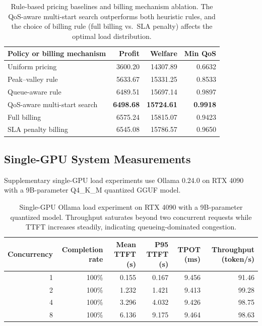 \documentclass[11pt]{article}
\begin{document}
\begin{table}[htbp]
\centering
\caption{Rule-based pricing baselines and billing mechanism ablation. The
QoS-aware multi-start search outperforms both heuristic rules, and the
choice of billing rule (full billing vs.\ SLA penalty) affects the optimal
load distribution.}
\label{tab:supplemental_policy}
\small
\begin{tabular}{lrrr}
\toprule
Policy or billing mechanism & Profit & Welfare & Min QoS \\
\midrule
Uniform pricing & 3600.20 & 14307.89 & 0.6632 \\
Peak--valley rule & 5633.67 & 15331.25 & 0.8533 \\
Queue-aware rule & 6489.51 & 15697.14 & 0.9897 \\
QoS-aware multi-start search & \textbf{6498.68} & \textbf{15724.61} & \textbf{0.9918} \\
\midrule
Full billing & 6575.24 & 15815.07 & 0.9423 \\
SLA penalty billing & 6545.08 & 15786.57 & 0.9650 \\
\bottomrule
\end{tabular}
\end{table}

\subsection{Single-GPU System Measurements}
\label{sec:system_measurement}

Supplementary single-GPU load experiments use Ollama 0.24.0 on RTX 4090
with a 9B-parameter Q4\_K\_M quantized GGUF model.

\begin{table}[htbp]
\centering
\caption{Single-GPU Ollama load experiment on RTX 4090 with a 9B-parameter quantized model. Throughput saturates beyond two concurrent requests while TTFT increases steadily, indicating queueing-dominated congestion.}
\label{tab:system_measurement}
\small
\begin{tabular}{rrrrrr}
\toprule
Concurrency & Completion rate & Mean TTFT (s) & P95 TTFT (s) & TPOT (ms) &
Throughput (token/s) \\
\midrule
1 & 100\% & 0.155 & 0.167 & 9.456 & 91.46 \\
2 & 100\% & 1.232 & 1.421 & 9.413 & 99.28 \\
4 & 100\% & 3.296 & 4.032 & 9.426 & 98.75 \\
8 & 100\% & 6.136 & 9.175 & 9.464 & 98.63 \\
\bottomrule
\end{tabular}
\end{table}
\end{document}
